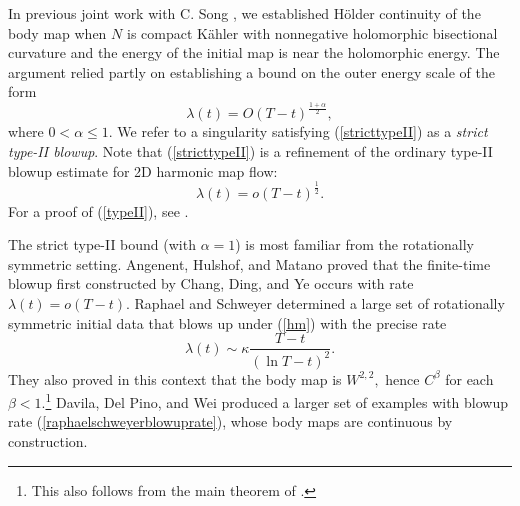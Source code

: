 \documentclass[12pt]{amsart}
\theoremstyle{others}
\numberwithin{equation}{section}
\begin{document}
In previous joint work with C. Song \cite{songwaldron}, we established H\"older continuity of the body map when $N$ is compact K\"ahler with nonnegative holomorphic bisectional curvature and the energy of the initial map is near the holomorphic energy. %
The argument relied partly on establishing a bound on the outer energy scale of the form
\begin{equation}\label{stricttypeII}
\lambda(t) = O(T - t)^{\frac{1 + \alpha}{2}},
\end{equation}
where $0 < \alpha \leq 1.$
We refer to a singularity satisfying (\ref{stricttypeII})
as a \emph{strict type-II blowup}. Note that (\ref{stricttypeII}) is a refinement of the ordinary type-II blowup estimate for 2D harmonic map flow: %
\begin{equation}\label{typeII}
\lambda(t) = o(T - t)^{\frac12}.
\end{equation}
For a proof of (\ref{typeII}), see %
\cite[Theorem 1.6v]{toppingwindingbehavior}. %



The strict type-II bound (with $\alpha = 1$) is most familiar from the rotationally symmetric setting. Angenent, Hulshof, and Matano \cite{angenenthulshofmatano} proved that the finite-time blowup first constructed by Chang, Ding, and Ye \cite{changdingye} occurs with rate $\lambda(t) = o(T - t).$ %
Raphael and Schweyer \cite{raphaelschweyer} determined a large set of rotationally symmetric initial data that blows up under (\ref{hm}) with the precise rate
\begin{equation}\label{raphaelschweyerblowuprate}
\lambda(t) \sim \kappa \frac{T - t}{(\ln T - t )^2}.
\end{equation}
They also proved in this context that the body map is $W^{2,2},$ hence $C^\beta$ for each $\beta < 1.$\footnote{This also follows from the main theorem of \cite{songwaldron}.} Davila, Del Pino, and Wei \cite{daviladelpinowei} produced a larger set of examples with blowup rate (\ref{raphaelschweyerblowuprate}), whose body maps are continuous by construction. %
\end{document}
